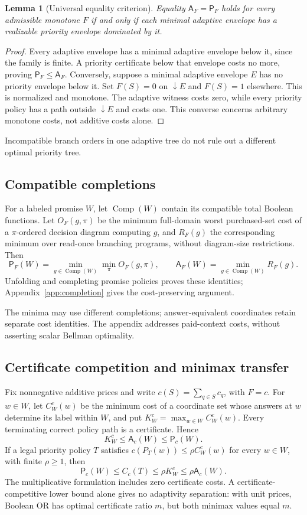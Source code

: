 \documentclass[pdflatex,sn-mathphys-num]{sn-jnl}
\newcommand{\A}{\mathsf{A}}
\newcommand{\Pcost}{\mathsf{P}}
\newcommand{\down}{\mathop{\downarrow}}
\newcommand{\Comp}{\operatorname{Comp}}
\theoremstyle{thmstyleone}
\newtheorem{lemma}[theorem]{Lemma}
\theoremstyle{thmstylethree}
\theoremstyle{thmstyletwo}
\begin{document}
\begin{lemma}[Universal equality criterion]\label{lem:criterion}
Equality $\A_F=\Pcost_F$ holds for every admissible monotone $F$ if and only if each minimal adaptive envelope has a realizable priority envelope dominated by it.
\end{lemma}
\begin{proof}
Every adaptive envelope has a minimal adaptive envelope below it, since the family is finite. A priority certificate below that envelope costs no more, proving $\Pcost_F\leq\A_F$. Conversely, suppose a minimal adaptive envelope $E$ has no priority envelope below it. Set $F(S)=0$ on $\down E$ and $F(S)=1$ elsewhere. This is normalized and monotone. The adaptive witness costs zero, while every priority policy has a path outside $\down E$ and costs one. This converse concerns arbitrary monotone costs, not additive costs alone.
\end{proof}

Incompatible branch orders in one adaptive tree do not rule out a different optimal priority tree.

\subsection{Compatible completions}\label{sec:completion}
For a labeled promise $W$, let $\Comp(W)$ contain its compatible total Boolean functions. Let $O_F(g,\pi)$ be the minimum full-domain worst purchased-set cost of a $\pi$-ordered decision diagram computing $g$, and $R_F(g)$ the corresponding minimum over read-once branching programs, without diagram-size restrictions. Then
\[
 \Pcost_F(W)=\min_{g\in\Comp(W)}\min_\pi O_F(g,\pi),\qquad
 \A_F(W)=\min_{g\in\Comp(W)}R_F(g).
\]
Unfolding and completing promise policies proves these identities; Appendix~\ref{app:completion} gives the cost-preserving argument.

The minima may use different completions; answer-equivalent coordinates retain separate cost identities. The appendix addresses paid-context costs, without asserting scalar Bellman optimality.

\subsection{Certificate competition and minimax transfer}\label{sec:cert-transfer}
Fix nonnegative additive prices and write $c(S)=\sum_{q\in S}c_q$, with $F=c$. For $w\in W$, let $C_W^c(w)$ be the minimum cost of a coordinate set whose answers at $w$ determine its label within $W$, and put $K_W^c=\max_{w\in W}C_W^c(w)$. Every terminating correct policy path is a certificate. Hence
\[
 K_W^c\leq\A_c(W)\leq\Pcost_c(W).
\]
If a legal priority policy $T$ satisfies $c(P_T(w))\leq\rho C_W^c(w)$ for every $w\in W$, with finite $\rho\geq1$, then
\[
 \Pcost_c(W)\leq C_c(T)\leq\rho K_W^c\leq\rho\A_c(W).
\]
The multiplicative formulation includes zero certificate costs. A certificate-competitive lower bound alone gives no adaptivity separation: with unit prices, Boolean OR has optimal certificate ratio $m$, but both minimax values equal $m$.
\end{document}

